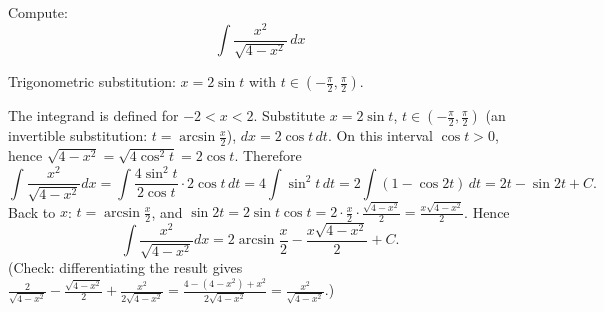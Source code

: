 
\begin{question}
Compute:
\[ \int\frac{x^2}{\sqrt{4-x^2}}\,dx \]
\end{question}

\begin{hint}
Trigonometric substitution: $x=2\sin t$ with $t\in(-\frac\pi2,\frac\pi2)$.
\end{hint}

\begin{solution}
The integrand is defined for $-2<x<2$. Substitute $x=2\sin t$, $t\in(-\frac\pi2,\frac\pi2)$ (an invertible substitution: $t=\arcsin\frac x2$), $dx=2\cos t\,dt$. On this interval $\cos t>0$, hence $\sqrt{4-x^2}=\sqrt{4\cos^2t}=2\cos t$. Therefore
\[ \int\frac{x^2}{\sqrt{4-x^2}}dx=\int\frac{4\sin^2t}{2\cos t}\cdot2\cos t\,dt=4\int\sin^2t\,dt=2\int(1-\cos2t)\,dt=2t-\sin2t+C. \]
Back to $x$: $t=\arcsin\frac x2$, and $\sin2t=2\sin t\cos t=2\cdot\frac x2\cdot\frac{\sqrt{4-x^2}}{2}=\frac{x\sqrt{4-x^2}}{2}$. Hence
\[ \boxed{\int\frac{x^2}{\sqrt{4-x^2}}dx=2\arcsin\frac x2-\frac{x\sqrt{4-x^2}}{2}+C.} \]
(Check: differentiating the result gives $\frac{2}{\sqrt{4-x^2}}-\frac{\sqrt{4-x^2}}{2}+\frac{x^2}{2\sqrt{4-x^2}}=\frac{4-(4-x^2)+x^2}{2\sqrt{4-x^2}}=\frac{x^2}{\sqrt{4-x^2}}$.)
\end{solution}
